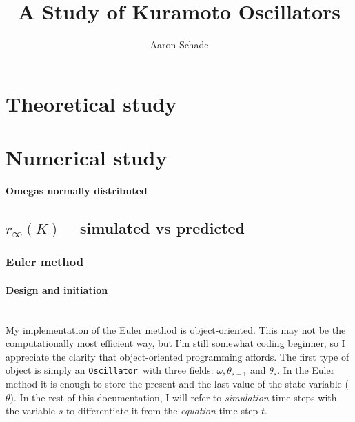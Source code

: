 \documentclass[11pt,a4paper]{article}
\title{\vspace{30mm}\huge \bfseries A Study of Kuramoto Oscillators}
\author{Aaron Schade}
\newcommand{\osc}{\texttt{Oscillator}~}
\newcommand{\para}[1]{\paragraph{#1}\mbox{}\\}
\begin{document}


\maketitle
\vfill
\tableofcontents
\vfill


\clearpage{}
\section{Theoretical study}















\section{Numerical study}

{\Large\textbf{Omegas normally distributed}}
\subsection{$r_{\infty}(K)$ -- simulated vs predicted}


\subsubsection{Euler method}
\para{Design and initiation}
My implementation of the Euler method is object-oriented. 
This may not be the computationally most efficient way, but I'm still somewhat coding beginner, so I appreciate the clarity that object-oriented programming affords.
The first type of object is simply an \osc with three fields: $\omega, \theta_{s-1}$ and $\theta_s$. 
In the Euler method it is enough to store the present and the last value of the state variable ($\theta$).
In the rest of this documentation, I will refer to \textit{simulation} time steps with the variable $s$ to differentiate it from the \textit{equation} time step $t$.
\end{document}
